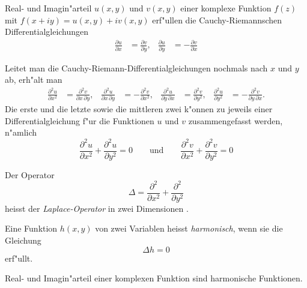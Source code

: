 \begin{satz}
\label{komplex:satz:cauchy-riemann}
Real- und Imagin"arteil $u(x,y)$ und $v(x,y)$ einer
komplexe Funktion $f(z)$ mit $f(x+iy)=u(x,y)+iv(x,y)$
erf"ullen die Cauchy-Riemannschen Differentialgleichungen
\begin{equation}
\begin{aligned}
\frac{\partial u}{\partial x}
&=
\frac{\partial v}{\partial y},
&
\frac{\partial u}{\partial y}
&=
-
\frac{\partial v}{\partial x}
\end{aligned}
\label{komplex:dgl:cauchy-riemann}
\end{equation}
\end{satz}

Leitet man die Cauchy-Riemann-Differentialgleichungen nochmals nach
$x$ und $y$ ab, erh"alt man
\begin{equation*}
\begin{aligned}
\frac{\partial^2 u}{\partial x^2}
&=
\frac{\partial^2 v}{\partial x\,\partial y},
&
\frac{\partial^2 u}{\partial x\,\partial y}
&=
-\frac{\partial^2 v}{\partial x^2},
&
\frac{\partial^2 u}{\partial y\,\partial x}
&=
\frac{\partial^2 v}{\partial y^2},
&
\frac{\partial^2 u}{\partial y^2}
&=
-\frac{\partial^2 v}{\partial y\,\partial x}.
\end{aligned}
\end{equation*}
Die erste und die letzte sowie die mittleren zwei k"onnen zu jeweils
einer Differentialgleichung f"ur die Funktionen $u$ und $v$ zusammengefasst
werden, n"amlich
\begin{equation*}
\frac{\partial^2 u}{\partial x^2}
+
\frac{\partial^2 u}{\partial y^2}
=
0
\qquad\text{und}\qquad
\frac{\partial^2 v}{\partial x^2}
+
\frac{\partial^2 v}{\partial y^2}
=
0
\end{equation*}

\begin{definition}
Der Operator 
\[
\Delta =
\frac{\partial^2}{\partial x^2}
+
\frac{\partial^2}{\partial y^2}
\]
heisst der {\em Laplace-Operator} in zwei Dimensionen
.
\end{definition}

\begin{definition}
Eine Funktion $h(x,y)$ von zwei Variablen heisst {\em harmonisch}, wenn sie
die Gleichung
\[
\Delta h=0
\]
erf"ullt.
\end{definition}

\begin{satz}
Real- und Imagin"arteil einer komplexen Funktion sind harmonische Funktionen.
\end{satz}

